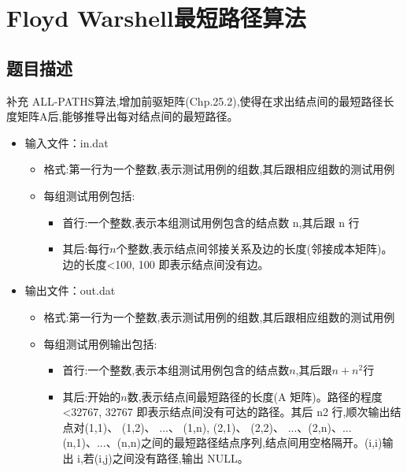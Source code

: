 \documentclass{report}
\begin{document}
\chapter{Floyd Warshell最短路径算法}
\label{cha:floyd_warshellzui_duan_lu_jing_suan_fa_}

\section{题目描述}
\label{sec:ti_mu_miao_shu_4}
补充 ALL-PATHS算法,增加前驱矩阵(Chp.25.2),使得在求出结点间的最短路径长度矩阵A后,能够推导出每对结点间的最短路径。
\begin{itemize}
    \item 输入文件：in.dat
        \begin{itemize}
            \item 格式:第一行为一个整数,表示测试用例的组数,其后跟相应组数的测试用例
            \item 每组测试用例包括:
                \begin{itemize}
                    \item 首行:一个整数,表示本组测试用例包含的结点数 n,其后跟 n 行
                    \item 其后:每行$n$个整数,表示结点间邻接关系及边的长度(邻接成本矩阵)。边的长度<100, 100 即表示结点间没有边。
                \end{itemize}
        \end{itemize}
    \item 输出文件：out.dat
        \begin{itemize}
            \item 格式:第一行为一个整数,表示测试用例的组数,其后跟相应组数的测试用例
            \item 每组测试用例输出包括:
                \begin{itemize}
                    \item 首行:一个整数,表示本组测试用例包含的结点数$n$,其后跟$n+n^2$行
                    \item 其后:开始的$n$数,表示结点间最短路径的长度(A 矩阵)。路径的程度<32767, 32767 即表示结点间没有可达的路径。其后 n2 行,顺次输出结点对(1,1)、 (1,2)、 ...、 (1,n), (2,1)、 (2,2)、 ...、(2,n)、...(n,1)、...、(n,n)之间的最短路径结点序列,结点间用空格隔开。(i,i)输出 i,若(i,j)之间没有路径,输出 NULL。
                \end{itemize}
        \end{itemize}
\end{itemize}
\end{document}
